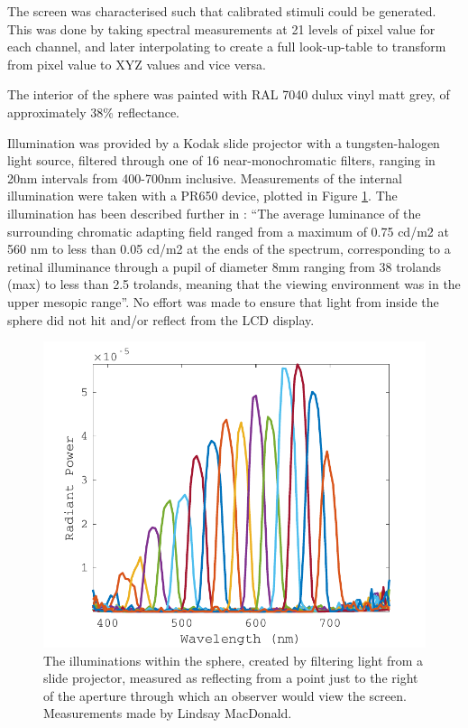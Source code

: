 The screen was characterised such that calibrated stimuli could be generated. This was done by taking spectral measurements at 21 levels of pixel value for each channel, and later interpolating to create a full look-up-table to transform from pixel value to XYZ values and vice versa.

The interior of the sphere was painted with RAL 7040 dulux vinyl matt grey, of approximately 38\% reflectance. 

Illumination was provided by a Kodak slide projector with a tungsten-halogen light source, filtered through one of 16 near-monochromatic filters, ranging in 20nm intervals from 400-700nm inclusive. Measurements of the internal illumination were taken with a \gls{PR650} device, plotted in Figure \ref{fig:LSillum}. The illumination has been described further in \citet{macdonald_chromatic_2013}: ``The average luminance of the surrounding chromatic adapting field ranged from a maximum of 0.75 cd/m2 at 560 nm to less than 0.05 cd/m2 at the ends of the spectrum, corresponding to a retinal illuminance through a pupil of diameter 8mm ranging from 38 trolands (max) to less than 2.5 trolands, meaning that the viewing environment was in the upper mesopic range''. No effort was made to ensure that light from inside the sphere did not hit and/or reflect from the LCD display. 

\begin{figure}[htbp]
\includegraphics[max width=\textwidth]{figs/LargeSphere/LSillum.pdf}
\caption{The illuminations within the sphere, created by filtering light from a slide projector, measured as reflecting from a point just to the right of the aperture through which an observer would view the screen. Measurements made by Lindsay MacDonald.}
\label{fig:LSillum}
\end{figure}

